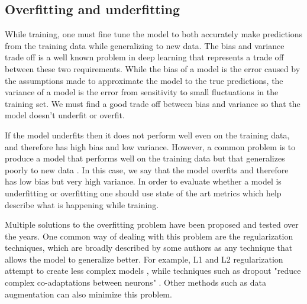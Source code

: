 \subsection{Overfitting and underfitting}
While training, one must fine tune the model to both accurately make predictions from the training data while generalizing to new data. The bias and variance trade off is a well known problem in deep learning that represents a trade off between these two requirements. While the bias of a model is the error caused by the assumptions made to approximate the model to the true predictions, the variance of a model is the error from sensitivity to small fluctuations in the training set. We must find a good trade off between bias and variance so that the model doesn't underfit or overfit. \par
If the model underfits then it does not perform well even on the training data, and therefore has high bias and low variance. However, a common problem is to produce a model that performs well on the training data but that generalizes poorly to new data \cite{Grus}. In this case, we say that the model overfits and therefore has low bias but very high variance. In order to evaluate whether a model is underfitting or overfitting one should use state of the art metrics which help describe what is happening while training. \par  
Multiple solutions to the overfitting problem have been proposed and tested over the years. One common way of dealing with this problem are the regularization techniques, which are broadly described by some authors as any technique that allows the model to generalize better. For example, L1 and L2 regularization attempt to create less complex models \cite{Ng}, while techniques such as dropout "reduce complex co-adaptations between neurons" \cite{Hinton2012}. Other methods such as data augmentation can also minimize this problem.
